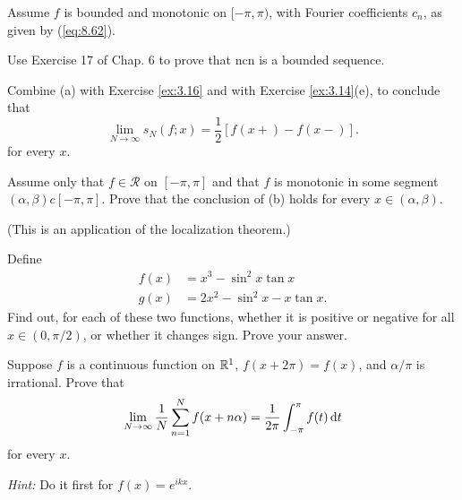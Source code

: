 \begin{myExercise}
    \label{ex:8.17}
    Assume $f$ is bounded and monotonic on $[-\pi, \pi)$, 
    with Fourier coefficients $c_n$, as given by (\ref{eq:8.62}).
    \begin{asparaenum}[(a)]
        \item Use Exercise 17 of Chap. 6 to prove that {ncn} is a bounded sequence.
        \item Combine (a) with Exercise \ref{ex:3.16} and with Exercise \ref{ex:3.14}(e), to conclude that 
        \begin{equation*}
            \lim_{N \to \infty} s_N(f;x) = \frac{1}{2}\left[ f(x+)-f(x-) \right].
        \end{equation*}
        for every $x$.
        \item Assume only that $f \in \mathscr{R}$ on $[-\pi,\pi]$ and that $f$ is monotonic in some segment
        $(\alpha, \beta)c [-\pi, \pi]$. 
        Prove that the conclusion of (b) holds for every $x \in (\alpha, \beta)$.
    \end{asparaenum}
    (This is an application of the localization theorem.)
\end{myExercise}


\begin{myExercise}
    \label{ex:8.18}
    Define
    \begin{align*}
        f(x) &= x^3 - \sin^2 x \tan x \\
        g(x) &= 2x^2 - \sin^2 x - x\tan x.
    \end{align*}
    Find out, for each of these two functions, whether it is positive or negative for all $x \in (0, \pi/2)$, or whether it changes sign. 
    Prove your answer.
\end{myExercise}


\begin{myExercise}
    \label{ex:8.19}
    Suppose $f$ is a continuous function on ${\protect\mathbb R}^1$,
    $f(x + 2\pi) = f(x)$, and $\alpha/\pi$ is irrational.
    Prove that
    \begin{equation*}
        \lim_{N \to \infty} \frac{1}{N} \sum_{n=1}^{N} f(x+n\alpha) = \frac{1}{2\pi} \int_{-\pi}^{\pi} f(t) \d t
    \end{equation*}
    for every $x$.

    \emph{Hint:} Do it first for $f(x) = e^{ikx}$.
\end{myExercise}


